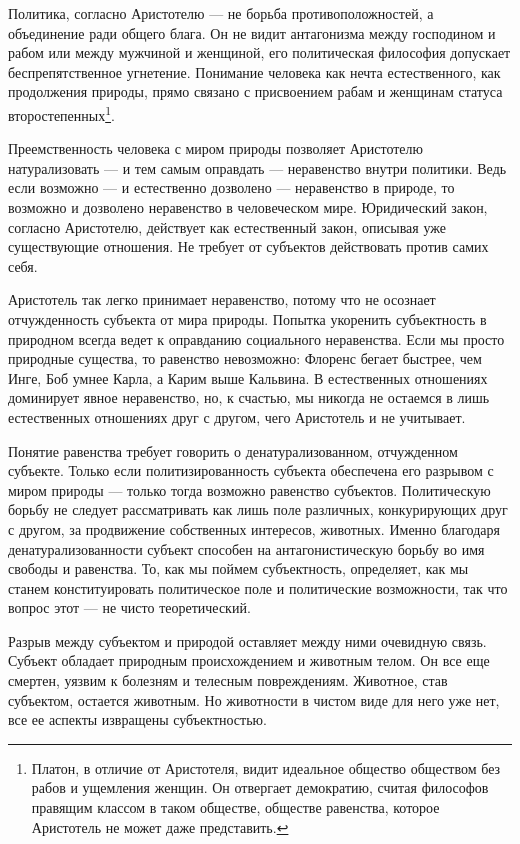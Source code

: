 \documentclass[12pt]{book}
\begin{document}
Политика, согласно Аристотелю --- не борьба противоположностей, а объединение ради общего блага. Он не видит антагонизма между господином и рабом или между мужчиной и женщиной, его политическая философия допускает беспрепятственное угнетение. Понимание человека как нечта естественного, как продолжения природы, прямо связано с присвоением рабам и женщинам статуса второстепенных\footnote{Платон, в отличие от Аристотеля, видит идеальное общество обществом без рабов и ущемления женщин. Он отвергает демократию, считая философов правящим классом в таком обществе, обществе равенства, которое Аристотель не может даже представить.}.

Преемственность человека с миром природы позволяет Аристотелю натурализовать --- и тем самым оправдать --- неравенство внутри политики. Ведь если возможно --- и естественно дозволено --- неравенство в природе, то возможно и дозволено неравенство в человеческом мире. Юридический закон, согласно Аристотелю, действует как естественный закон, описывая уже существующие отношения. Не требует от субъектов действовать против самих себя.

Аристотель так легко принимает неравенство, потому что не осознает отчужденность субъекта от мира природы. Попытка укоренить субъектность в природном всегда ведет к оправданию социального неравенства. Если мы просто природные существа, то равенство невозможно: Флоренс бегает быстрее, чем Инге, Боб умнее Карла, а Карим выше Кальвина. В естественных отношениях доминирует явное неравенство, но, к счастью, мы никогда не остаемся в лишь естественных отношениях друг с другом, чего Аристотель и не учитывает.

Понятие равенства требует говорить о денатурализованном, отчужденном субъекте. Только если политизированность субъекта обеспечена его разрывом с миром природы --- только тогда возможно равенство субъектов. Политическую борьбу не следует рассматривать как лишь поле различных, конкурирующих друг с другом, за продвижение собственных интересов, животных. Именно благодаря денатурализованности субъект способен на антагонистическую борьбу во имя свободы и равенства. То, как мы поймем субъектность, определяет, как мы станем конституировать политическое поле и политические возможности, так что вопрос этот --- не чисто теоретический.

Разрыв между субъектом и природой оставляет между ними очевидную связь. Субъект обладает природным происхождением и животным телом. Он все еще смертен, уязвим к болезням и телесным повреждениям. Животное, став субъектом, остается животным. Но животности в чистом виде для него уже нет, все ее аспекты извращены субъектностью.
\end{document}
